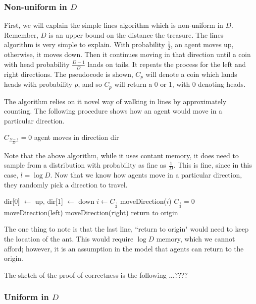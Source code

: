 \documentclass[runningheads,a4paper]{llncs}
\begin{document}
\subsubsection{Non-uniform in $D$} First, we will explain the simple lines algorithm which is non-uniform in $D$. Remember, $D$ is an upper bound on the distance the treasure. The lines algorithm is very simple to explain. With probability $\frac{1}{2}$, an agent moves up, otherwise, it moves down. Then it continues moving in that direction until a coin with head probability $\frac{D-1}{D}$ lands on tails. It repeats the process for the left and right directions. The pseudocode is shown, $C_p$ will denote a coin which lands heads with probability $p$, and so $C_p$ will return a 0 or 1, with 0 denoting heads.

The algorithm relies on it novel way of walking in lines by approximately counting. The following procedure shows how an agent would move in a particular direction. 

\begin{codebox}
\li \While $C_{\frac{D-1}{D}} = 0$ \Then
\li agent moves in direction dir \End
\end{codebox}

Note that the above algorithm, while it uses contant memory, it does need to sample from a distribution with probability as fine as $\frac{1}{D}$. This is fine, since in this case, $l = \log D$. 
Now that we know how agents move in a particular direction, they randomly pick a direction to travel.

\begin{codebox}
\li dir[0] $\leftarrow$ up, dir[1] $\leftarrow$ down
\li $i \leftarrow C_{\frac{1}{2}}$
\li moveDirection($i$)
\li \If $C_{\frac{1}{2}} = 0$ \Then
\li moveDirection(left)
\li \Else moveDirection(right) \End \End
\li return to origin
\end{codebox}

The one thing to note is that the last line, ``return to origin" would need to keep the location of the ant. This would require $\log D$ memory, which we cannot afford; however, it is an assumption in the model that agents can return to the origin.

The sketch of the proof of correctness is the following ...????

\subsubsection{Uniform in $D$}
\end{document}
